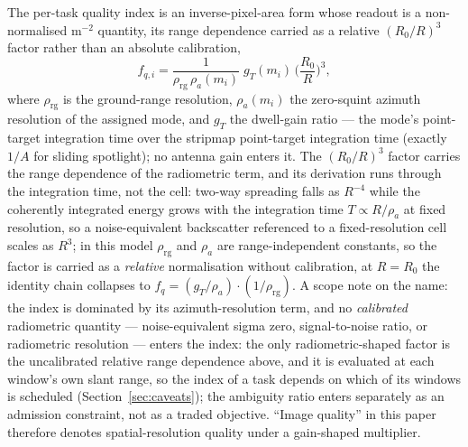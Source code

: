 \documentclass[preprint,authoryear]{elsarticle}
\begin{document}
The per-task quality index is an inverse-pixel-area form whose readout is a non-normalised $\mathrm{m}^{-2}$ quantity, its range dependence carried as a relative $(R_0/R)^3$ factor rather than an absolute calibration,
\[
f_{q,i}=\frac{1}{\rho_{\mathrm{rg}}\,\rho_{a}(m_i)}\;g_T(m_i)\,\Big(\frac{R_0}{R}\Big)^{3},
\]
where $\rho_{\mathrm{rg}}$ is the ground-range resolution, $\rho_a(m_i)$ the zero-squint azimuth resolution of the assigned mode, and $g_T$ the dwell-gain ratio --- the mode's point-target integration time over the stripmap point-target integration time (exactly $1/A$ for sliding spotlight); no antenna gain enters it. The $(R_0/R)^3$ factor carries the range dependence of the radiometric term, and its derivation runs through the integration time, not the cell: two-way spreading falls as $R^{-4}$ while the coherently integrated energy grows with the integration time $T\propto R/\rho_a$ at fixed resolution, so a noise-equivalent backscatter referenced to a fixed-resolution cell scales as $R^{3}$; in this model $\rho_{\mathrm{rg}}$ and $\rho_a$ are range-independent constants, so the factor is carried as a \emph{relative} normalisation without calibration, at $R=R_0$ the identity chain collapses to $f_q=(g_T/\rho_a)\cdot(1/\rho_{\mathrm{rg}})$. A scope note on the name: the index is dominated by its azimuth-resolution term, and no \emph{calibrated} radiometric quantity --- noise-equivalent sigma zero, signal-to-noise ratio, or radiometric resolution --- enters the index: the only radiometric-shaped factor is the uncalibrated relative range dependence above, and it is evaluated at each window's own slant range, so the index of a task depends on which of its windows is scheduled (Section~\ref{sec:caveats}); the ambiguity ratio enters separately as an admission constraint, not as a traded objective. ``Image quality'' in this paper therefore denotes spatial-resolution quality under a gain-shaped multiplier.
\end{document}
